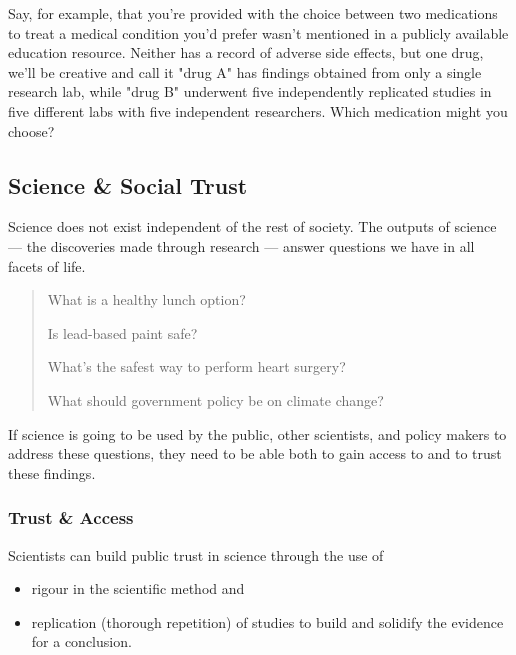 \documentclass[
]{book}
\providecommand{\tightlist}{%
  \setlength{\itemsep}{0pt}\setlength{\parskip}{0pt}}
\begin{document}
Say, for example, that you're provided with the choice between two medications to treat a medical condition you'd prefer wasn't mentioned in a publicly available education resource. Neither has a record of adverse side effects, but one drug, we'll be creative and call it "drug A" has findings obtained from only a single research lab, while "drug B" underwent five independently replicated studies in five different labs with five independent researchers. Which medication might you choose?

\hypertarget{science-social-trust}{%
\subsection*{Science \& Social Trust}\label{science-social-trust}}

Science does not exist independent of the rest of society. The outputs of science --- the discoveries made through research --- answer questions we have in all facets of life.

\begin{quote}
What is a healthy lunch option?

Is lead-based paint safe?

What's the safest way to perform heart surgery?

What should government policy be on climate change?
\end{quote}

If science is going to be used by the public, other scientists, and policy makers to address these questions, they need to be able both to gain access to and to trust these findings.

\hypertarget{trust-access}{%
\subsubsection*{Trust \& Access}\label{trust-access}}

Scientists can build public trust in science through the use of

\begin{itemize}
\tightlist
\item
  rigour in the scientific method and
\item
  replication (thorough repetition) of studies to build and solidify the evidence for a conclusion.
\end{itemize}
\end{document}
